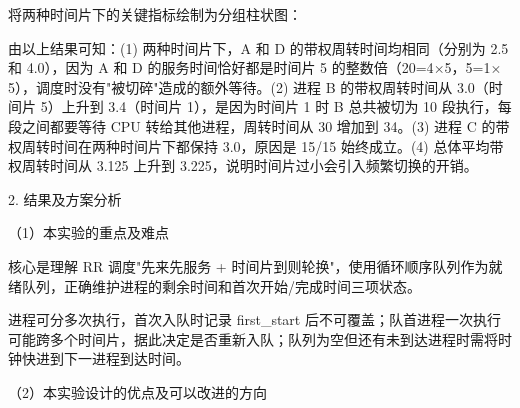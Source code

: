 \noindent\hspace*{2em}将两种时间片下的关键指标绘制为分组柱状图：\par
\begin{center}
\end{center}
\noindent\hspace*{2em}由以上结果可知：(1) 两种时间片下，A 和 D 的带权周转时间均相同（分别为 2.5 和 4.0），因为 A 和 D 的服务时间恰好都是时间片 5 的整数倍（20=4$\times$5，5=1$\times$5），调度时没有"被切碎"造成的额外等待。(2) 进程 B 的带权周转时间从 3.0（时间片 5）上升到 3.4（时间片 1），是因为时间片 1 时 B 总共被切为 10 段执行，每段之间都要等待 CPU 转给其他进程，周转时间从 30 增加到 34。(3) 进程 C 的带权周转时间在两种时间片下都保持 3.0，原因是 15/15 始终成立。(4) 总体平均带权周转时间从 3.125 上升到 3.225，说明时间片过小会引入频繁切换的开销。\par
\noindent\hspace*{2em}2. 结果及方案分析\par
\noindent\hspace*{2em}（1）本实验的重点及难点\par
\noindent\hspace*{2em}核心是理解 RR 调度"先来先服务 + 时间片到则轮换"，使用循环顺序队列作为就绪队列，正确维护进程的剩余时间和首次开始/完成时间三项状态。\par
\noindent\hspace*{2em}进程可分多次执行，首次入队时记录 first\_start 后不可覆盖；队首进程一次执行可能跨多个时间片，据此决定是否重新入队；队列为空但还有未到达进程时需将时钟快进到下一进程到达时间。\par
\noindent\hspace*{2em}（2）本实验设计的优点及可以改进的方向\par
